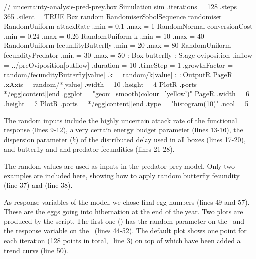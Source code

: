 \lstset{numbers=left}
\begin{boxscript}
// uncertainty-analysis-pred-prey.box
Simulation sim {
  .iterations = 128
  .steps = 365
  .silent = TRUE
  Box random {
    RandomiserSobolSequence randomiser {
    }
    RandomUniform attackRate {
      .min = 0.1
      .max = 1
    }
    RandomNormal conversionCost {
      .min = 0.24
      .max = 0.26
    }
    RandomUniform k {
      .min = 10
      .max = 40
    }
    RandomUniform fecundityButterfly {
      .min = 20
      .max = 80
    }
    RandomUniform fecundityPredator {
      .min = 30
      .max = 50
    }
  }
  :
  Box butterfly {
  :
      Stage oviposition {
        .inflow = ../preOviposition[outflow]
        .duration = 10
        .timeStep = 1
        .growthFactor = random/fecundityButterfly[value]
        .k = random/k[value]
      }
  :
  }
  :
  OutputR {
    PageR {
      .xAxis = random/*[value]
      .width = 10
      .height = 4
      PlotR {
        .ports = */egg[content]|end
        .ggplot = "geom_smooth(colour='yellow')"
      }
    }
    PageR {
      .width = 6
      .height = 3
      PlotR {
        .ports = */egg[content]|end
        .type = "histogram(10)"
        .ncol = 5
      }
    }
  }
}
\end{boxscript}
\lstset{numbers=none}

The random inputs include the highly uncertain attack rate of the functional response (lines 9-12), a very certain energy budget parameter (lines 13-16), the dispersion parameter ($k$) of the distributed delay used in all  boxes (lines 17-20), and butterfly and and predator fecundities (lines 21-28).

The random values are used as inputs in the predator-prey model. Only two examples are included here, showing how to apply random butterfly fecundity (line 37) and  (line 38).

As response variables of the model, we chose final egg numbers (lines 49 and 57). These are the eggs going into hibernation at the end of the year. Two plots are produced by the script. The first one () has the random parameter on the \xaxis\ and the response variable on the \yaxis\ (lines 44-52). The default plot shows one point for each iteration (128 points in total, \cf\ line 3) on top of which have been added a trend curve (line 50). 

